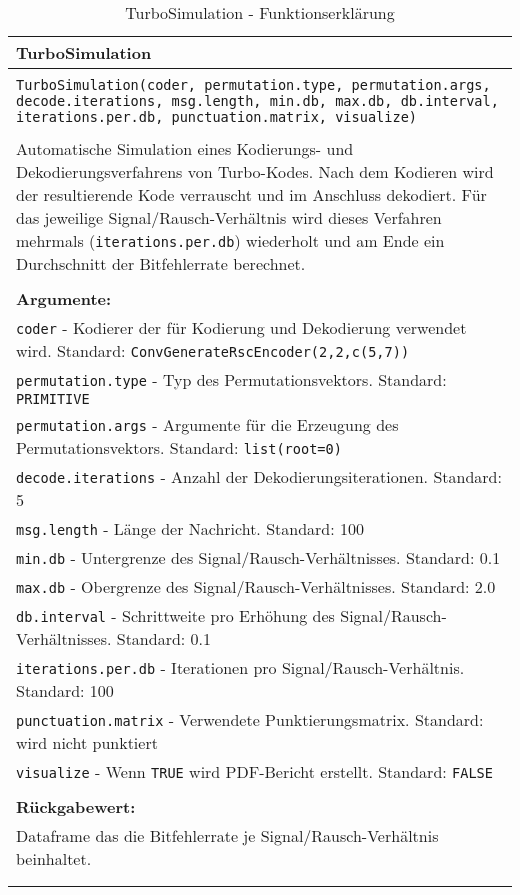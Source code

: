 \begin{longtable}{|p{\textwidth}|}
\hline
\rowcolor{lightblue}TurboSimulation\\
\hline
\\
\texttt{TurboSimulation(coder, permutation.type, permutation.args, decode.iterations, msg.length, min.db, max.db, db.interval, iterations.per.db, punctuation.matrix, visualize)}\\
\\
Automatische Simulation eines Kodierungs- und Dekodierungsverfahrens von Turbo-Kodes. Nach dem Kodieren wird der resultierende Kode verrauscht und im Anschluss dekodiert. Für das jeweilige Signal/Rausch-Verhältnis wird dieses Verfahren mehrmals (\texttt{iterations.per.db}) wiederholt und am Ende ein Durchschnitt der Bitfehlerrate berechnet.\\
\\
\textbf{Argumente:}\\
\texttt{coder} - Kodierer der für Kodierung und Dekodierung verwendet wird. Standard: \texttt{ConvGenerateRscEncoder(2,2,c(5,7))}\\
\texttt{permutation.type} - Typ des Permutationsvektors. Standard: \texttt{PRIMITIVE}\\
\texttt{permutation.args} - Argumente für die Erzeugung des Permutationsvektors. Standard: \texttt{list(root=0)}\\
\texttt{decode.iterations} - Anzahl der Dekodierungsiterationen. Standard: 5\\
\texttt{msg.length} - Länge der Nachricht. Standard: 100\\
\texttt{min.db} - Untergrenze des Signal/Rausch-Verhältnisses. Standard: 0.1\\
\texttt{max.db} - Obergrenze des Signal/Rausch-Verhältnisses. Standard: 2.0\\
\texttt{db.interval} - Schrittweite pro Erhöhung des Signal/Rausch-Verhältnisses. Standard: 0.1\\
\texttt{iterations.per.db} - Iterationen pro Signal/Rausch-Verhältnis. Standard: 100\\
\texttt{punctuation.matrix} - Verwendete Punktierungsmatrix. Standard: wird nicht punktiert\\
\texttt{visualize} - Wenn \texttt{TRUE} wird PDF-Bericht erstellt. Standard: \texttt{FALSE}\\
\\
\textbf{Rückgabewert:}\\
Dataframe das die Bitfehlerrate je Signal/Rausch-Verhältnis beinhaltet.\\
\\
\hline
\caption[TurboSimulation]{TurboSimulation - Funktionserklärung}
\end{longtable}